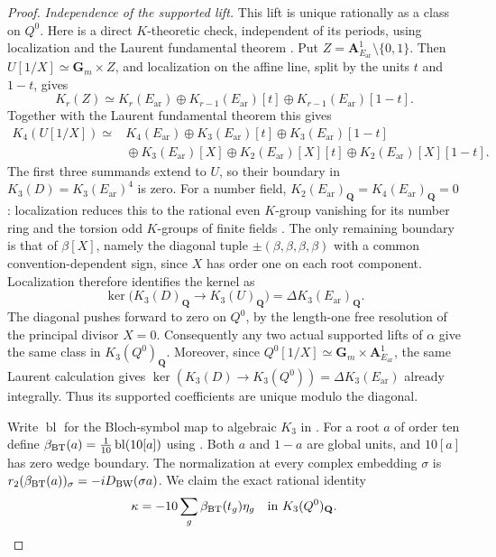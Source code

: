\documentclass[11pt,a4paper]{amsart}
\numberwithin{equation}{section}
\theoremstyle{definition}
\theoremstyle{remark}
\begin{document}
\begin{proof}
\emph{Independence of the supported lift.}
This lift is unique rationally as a class on $Q^0$.
Here is a direct $K$-theoretic check, independent of its periods,
using localization and the Laurent fundamental theorem \cite{Weibel}.
Put $Z=\mathbf A^1_{E_{\mathrm{ar}}}\setminus\{0,1\}$.  Then
$U[1/X]\simeq\mathbf G_m\times Z$, and localization on the
affine line, split by the units $t$ and $1-t$, gives
\[
 K_r(Z)\simeq K_r(E_{\mathrm{ar}})\oplus
       K_{r-1}(E_{\mathrm{ar}})[t]\oplus K_{r-1}(E_{\mathrm{ar}})[1-t].
\]
Together with the Laurent fundamental theorem this gives
\[
\begin{split}
 K_4(U[1/X])\simeq{}&
 K_4(E_{\mathrm{ar}})\oplus K_3(E_{\mathrm{ar}})[t]\oplus K_3(E_{\mathrm{ar}})[1-t]\\
 &{}\oplus K_3(E_{\mathrm{ar}})[X]
 \oplus K_2(E_{\mathrm{ar}})[X][t]\oplus K_2(E_{\mathrm{ar}})[X][1-t].
\end{split}
\]
The first three summands extend to $U$, so their boundary in
$K_3(D)=K_3(E_{\mathrm{ar}})^4$ is zero.  For a number field,
$K_2(E_{\mathrm{ar}})_{\mathbf Q}=K_4(E_{\mathrm{ar}})_{\mathbf Q}=0$: localization
reduces this to the rational even $K$-group vanishing for its
number ring \cite[Proposition~12.2]{Borel} and the torsion odd
$K$-groups of finite fields
\cite{QuillenFinite}\cite[IV, Corollary~1.13]{Weibel}.
The only remaining boundary is that of
$\beta[X]$, namely the diagonal tuple
$\pm(\beta,\beta,\beta,\beta)$ with a common convention-dependent
sign, since $X$ has order one on each root component. Localization therefore
identifies the kernel as
\[
 \ker\bigl(K_3(D)_{\mathbf Q}\longrightarrow K_3(U)_{\mathbf Q}\bigr)
       =\Delta K_3(E_{\mathrm{ar}})_{\mathbf Q}.
\]
The diagonal pushes forward to zero on $Q^0$, by the
length-one free resolution of the principal divisor $X=0$.
Consequently any two actual supported lifts of $\alpha$ give
the same class in $K_3(Q^0)_{\mathbf Q}$.
Moreover, since
$Q^0[1/X]\simeq\mathbf G_m\times\mathbf A^1_{E_{\mathrm{ar}}}$, the same
Laurent calculation gives
$\ker(K_3(D)\to K_3(Q^0))=\Delta K_3(E_{\mathrm{ar}})$ already integrally.
Thus its supported coefficients are unique modulo the diagonal.

Write $\operatorname{bl}$ for the Bloch-symbol map to algebraic
$K_3$ in \cite[Theorem~4.9]{BunkeTamme}. For a root $a$ of order ten define
$\beta_{\rm BT}(a)=\frac1{10}\operatorname{bl}(10[a])$
using \cite[Theorem~4.9 and (4.8)]{BunkeTamme}. Both $a$ and
$1-a$ are global units, and $10[a]$ has zero wedge boundary.
The normalization at every complex embedding $\sigma$ is
$r_2(\beta_{\rm BT}(a))_\sigma=-iD_{\rm BW}(\sigma a)$.
We claim the exact rational identity
\begin{equation}\label{d2ext:dimtwoUniversalCoefficients}
 \kappa=-10\sum_g\beta_{\rm BT}(t_g)\eta_g
          \quad\hbox{in }K_3(Q^0)_{\mathbf Q}.
\end{equation}


\end{proof}
\end{document}
